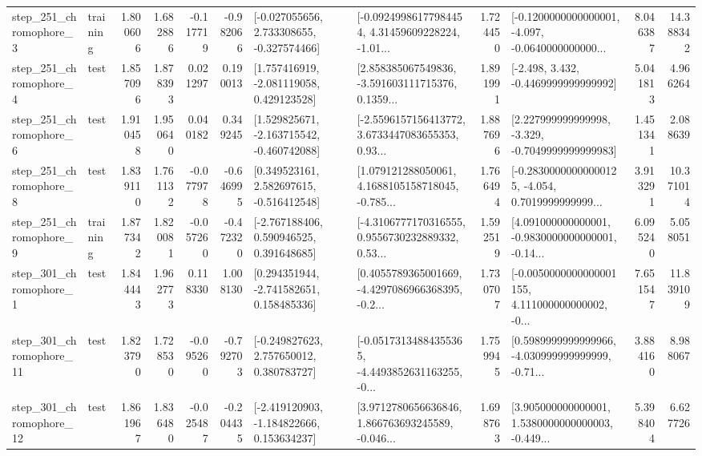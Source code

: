 \begin{tabular}{llrrrrllrlrr}
   step\_251\_chromophore\_3 &  training &      1.800606 &    1.682886 &     -0.117719 & -0.982066 &   [-0.027055656, 2.733308655, -0.327574466] &  [-0.09249986177984454, 4.31459609228224, -1.01... &       1.724450 &  [-0.1200000000000001, -4.097, -0.0640000000000... &            8.046387 &         14.388342 \\
   step\_251\_chromophore\_4 &      test &      1.857096 &    1.878393 &      0.021297 &  0.190013 &    [1.757416919, -2.081119058, 0.429123528] &  [2.858385067549836, -3.591603111715376, 0.1359... &       1.891991 &               [-2.498, 3.432, -0.4469999999999992] &            5.041813 &          4.966264 \\
   step\_251\_chromophore\_6 &      test &      1.910458 &    1.950640 &      0.040182 &  0.349245 &   [1.529825671, -2.163715542, -0.460742088] &  [-2.5596157156413772, 3.6733447083655353, 0.93... &       1.887696 &   [2.227999999999998, -3.329, -0.7049999999999983] &            1.451341 &          2.088639 \\
   step\_251\_chromophore\_8 &      test &      1.839110 &    1.761132 &     -0.077978 & -0.646995 &    [0.349523161, 2.582697615, -0.516412548] &  [1.079121288050061, 4.1688105158718045, -0.785... &       1.766494 &  [-0.28300000000000125, -4.054, 0.7019999999999... &            3.913291 &         10.371014 \\
   step\_251\_chromophore\_9 &  training &      1.877342 &    1.820081 &     -0.057260 & -0.472320 &    [-2.767188406, 0.590946525, 0.391648685] &  [-4.3106777170316555, 0.9556730232889332, 0.53... &       1.592519 &  [4.091000000000001, -0.9830000000000001, -0.14... &            6.095240 &          5.058051 \\
   step\_301\_chromophore\_1 &      test &      1.844443 &    1.962773 &      0.118330 &  1.008130 &    [0.294351944, -2.741582651, 0.158485336] &  [0.4055789365001669, -4.4297086966368395, -0.2... &       1.730707 &  [-0.0050000000000001155, 4.111000000000002, -0... &            7.651547 &         11.839109 \\
  step\_301\_chromophore\_11 &      test &      1.823790 &    1.728530 &     -0.095260 & -0.792703 &    [-0.249827623, 2.757650012, 0.380783727] &  [-0.05173134884355365, -4.4493852631163255, -0... &       1.759945 &  [0.5989999999999966, -4.030999999999999, -0.71... &            3.884160 &          8.988067 \\
  step\_301\_chromophore\_12 &      test &      1.861967 &    1.836480 &     -0.025487 & -0.204435 &   [-2.419120903, -1.184822666, 0.153634237] &  [3.9712780656636846, 1.866763693245589, -0.046... &       1.698763 &  [3.905000000000001, 1.5380000000000003, -0.449... &            5.398404 &          6.627726 \\

\end{tabular}
